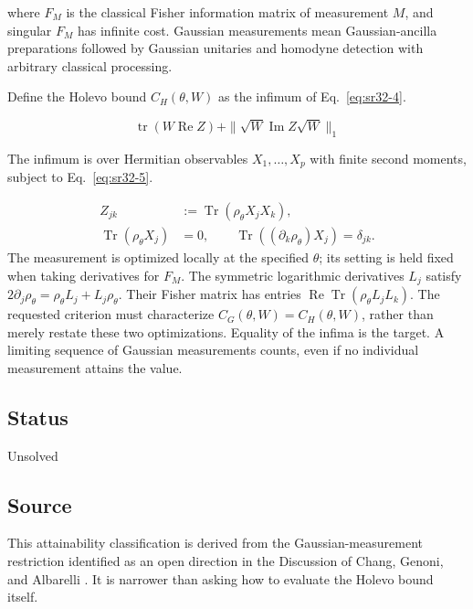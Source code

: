 where $F_M$ is the classical Fisher information matrix of measurement $M$, and singular $F_M$ has infinite cost. Gaussian measurements mean Gaussian-ancilla preparations followed by Gaussian unitaries and homodyne detection with arbitrary classical processing.

Define the Holevo bound $C_H(\theta,W)$ as the infimum of Eq.~\eqref{eq:sr32-4}.

\begin{equation}
\operatorname{tr}(W\operatorname{Re}Z)+\|\sqrt W\operatorname{Im}Z\sqrt W\|_1
\label{eq:sr32-4}
\end{equation}

The infimum is over Hermitian observables $X_1,\ldots,X_p$ with finite second moments, subject to Eq.~\eqref{eq:sr32-5}.

\begin{equation}
\begin{aligned}
 Z_{jk}&:=\operatorname{Tr}(\rho_\theta X_jX_k),\\
 \operatorname{Tr}(\rho_\theta X_j)&=0,\qquad
 \operatorname{Tr}((\partial_k\rho_\theta)X_j)=\delta_{jk}.
\end{aligned}
\label{eq:sr32-5}
\end{equation}
The measurement is optimized locally at the specified $\theta$; its setting is held fixed when taking derivatives for $F_M$.
The symmetric logarithmic derivatives $L_j$ satisfy $2\partial_j\rho_\theta=\rho_\theta L_j+L_j\rho_\theta$.
Their Fisher matrix has entries $\operatorname{Re}\operatorname{Tr}(\rho_\theta L_jL_k)$.
The requested criterion must characterize $C_G(\theta,W)=C_H(\theta,W)$, rather than merely restate these two optimizations.
Equality of the infima is the target. A limiting sequence of Gaussian measurements counts, even if no individual measurement attains the value.

\subsection*{Status}

Unsolved

\subsection*{Source}

This attainability classification is derived from the Gaussian-measurement restriction identified as an open direction in the Discussion of Chang, Genoni, and Albarelli . It is narrower than asking how to evaluate the Holevo bound itself.

